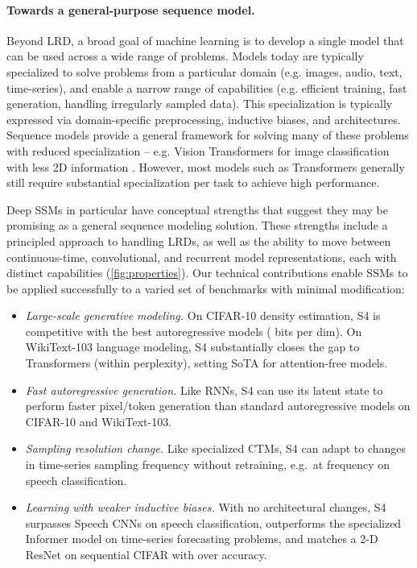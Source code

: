 \documentclass{article}
\newcommand{\methodabbrv}{S4}
\begin{document}
\paragraph{Towards a general-purpose sequence model.}
Beyond LRD, a broad goal of machine learning is to develop a single model that can be used across a wide range of problems.
Models today are typically specialized to solve problems from a particular domain (e.g. images, audio, text, time-series), and enable a narrow range of capabilities (e.g. efficient training, fast generation, handling irregularly sampled data).
This specialization is typically expressed via domain-specific preprocessing, inductive biases, and architectures. Sequence models provide a general framework for solving many of these problems with reduced specialization
-- e.g. Vision Transformers for image classification with less 2D information \citep{dosovitskiy2020image}. However, most models such as Transformers generally still require substantial specialization per task to achieve high performance.





Deep SSMs in particular have conceptual strengths that suggest they may be promising as a general sequence modeling solution.
These strengths include a principled approach to handling LRDs, as well as the ability to move between continuous-time, convolutional, and recurrent model representations, each with distinct capabilities (\cref{fig:properties}). Our technical contributions enable SSMs to be applied successfully to a varied set of benchmarks with minimal modification: \begin{itemize}[leftmargin=*]
    \item {\it Large-scale generative modeling.}
        On CIFAR-10 density estimation, \methodabbrv{} is competitive with the best autoregressive models ( bits per dim). On WikiText-103 language modeling, \methodabbrv{} substantially closes the gap to Transformers (within  perplexity), setting SoTA for attention-free models.
    \item {\it Fast autoregressive generation.}
        Like RNNs, \methodabbrv{} can use its latent state to perform  faster pixel/token generation than standard autoregressive models on CIFAR-10 and WikiText-103.
    \item {\it Sampling resolution change.}
        Like specialized CTMs, \methodabbrv{} can adapt to changes in time-series sampling frequency without retraining, e.g.\ at  frequency on speech classification.
    \item {\it Learning with weaker inductive biases.}
        With no architectural changes, \methodabbrv{} surpasses Speech CNNs on speech classification, outperforms the specialized Informer model on time-series forecasting problems,
        and matches a 2-D ResNet on sequential CIFAR with over  accuracy.



\end{itemize}
\end{document}
